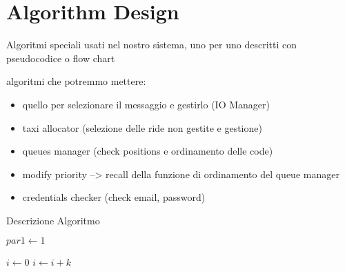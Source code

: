 \documentclass[../../dd.tex]{subfiles}
\begin{document}
	\chapter{Algorithm Design}
		Algoritmi speciali usati nel nostro sistema, uno per uno descritti con pseudocodice o flow chart

		algoritmi che potremmo mettere:
		\begin{itemize}
				\item quello per selezionare il messaggio e gestirlo (IO Manager)
				\item taxi allocator (selezione delle ride non gestite e gestione)
				\item queues manager (check positions e ordinamento delle code)
				\item modify priority --> recall della funzione di ordinamento del queue manager
				\item credentials checker (check email, password)
		\end{itemize}

		\begin{algorithm}
			\caption{Descrizione Algoritmo}\label{alg:descrizioneAlgoritmo}
			\begin{algorithmic}[1]
				\State $par1\gets 1$

				    \State $i\gets 0$
				\Else
				        \State $i\gets i+k$
				    \EndIf
				\EndIf
			\EndProcedure
			\end{algorithmic}
		\end{algorithm}
\end{document}
